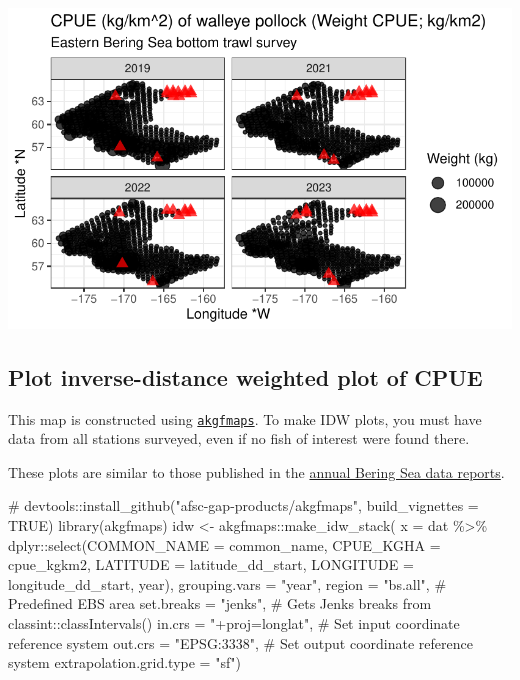 \documentclass[
  letterpaper,
  oneside,
  open=any]{scrbook}
\newenvironment{Shaded}{\begin{snugshade}}{\end{snugshade}}
\newcommand{\AttributeTok}[1]{\textcolor[rgb]{0.40,0.45,0.13}{#1}}
\newcommand{\CommentTok}[1]{\textcolor[rgb]{0.37,0.37,0.37}{#1}}
\newcommand{\FunctionTok}[1]{\textcolor[rgb]{0.28,0.35,0.67}{#1}}
\newcommand{\NormalTok}[1]{\textcolor[rgb]{0.00,0.23,0.31}{#1}}
\newcommand{\OtherTok}[1]{\textcolor[rgb]{0.00,0.23,0.31}{#1}}
\newcommand{\SpecialCharTok}[1]{\textcolor[rgb]{0.37,0.37,0.37}{#1}}
\newcommand{\StringTok}[1]{\textcolor[rgb]{0.13,0.47,0.30}{#1}}
\begin{document}
\includegraphics{content/foss-api-r_files/figure-pdf/pollock-multi-loc-1.pdf}

\subsection{Plot inverse-distance weighted plot of
CPUE}\label{plot-inverse-distance-weighted-plot-of-cpue}

This map is constructed using
\href{https://github.com/afsc-gap-products/akgfmaps}{\texttt{akgfmaps}}.
To make IDW plots, you must have data from all stations surveyed, even
if no fish of interest were found there.

These plots are similar to those published in the
\href{https://www.fisheries.noaa.gov/alaska/science-data/groundfish-assessment-program-bottom-trawl-surveys\#communications}{annual
Bering Sea data reports}.

\begin{Shaded}
\begin{Highlighting}[]
\CommentTok{\# devtools::install\_github("afsc{-}gap{-}products/akgfmaps", build\_vignettes = TRUE)}
\FunctionTok{library}\NormalTok{(akgfmaps)}
\NormalTok{idw }\OtherTok{\textless{}{-}}\NormalTok{ akgfmaps}\SpecialCharTok{::}\FunctionTok{make\_idw\_stack}\NormalTok{(}
  \AttributeTok{x =}\NormalTok{ dat }\SpecialCharTok{\%\textgreater{}\%} 
\NormalTok{    dplyr}\SpecialCharTok{::}\FunctionTok{select}\NormalTok{(}\AttributeTok{COMMON\_NAME =}\NormalTok{ common\_name, }
                  \AttributeTok{CPUE\_KGHA =}\NormalTok{ cpue\_kgkm2, }
                  \AttributeTok{LATITUDE =}\NormalTok{ latitude\_dd\_start, }
                  \AttributeTok{LONGITUDE =}\NormalTok{ longitude\_dd\_start, }
\NormalTok{                  year), }
  \AttributeTok{grouping.vars =} \StringTok{"year"}\NormalTok{, }
  \AttributeTok{region =} \StringTok{"bs.all"}\NormalTok{, }\CommentTok{\# Predefined EBS area}
  \AttributeTok{set.breaks =} \StringTok{"jenks"}\NormalTok{, }\CommentTok{\# Gets Jenks breaks from classint::classIntervals()}
  \AttributeTok{in.crs =} \StringTok{"+proj=longlat"}\NormalTok{, }\CommentTok{\# Set input coordinate reference system}
  \AttributeTok{out.crs =} \StringTok{"EPSG:3338"}\NormalTok{, }\CommentTok{\# Set output coordinate reference system}
  \AttributeTok{extrapolation.grid.type =} \StringTok{"sf"}\NormalTok{)}
\end{Highlighting}
\end{Shaded}
\end{document}

